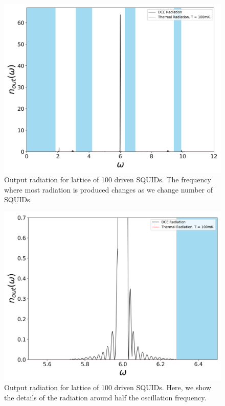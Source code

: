 %
\begin{figure}[h]
    \includegraphics[width=\textwidth, keepaspectratio]{figures/results/100_SQUIDs_active_100mK.png}
    \caption{Output radiation for lattice of 100 driven SQUIDs. The frequency where most radiation is produced changes as we change number of SQUIDs.}
    \label{fig:100_SQUIDs_active}
\end{figure}

\clearpage
%
\begin{figure}[h]
    \includegraphics[width=\textwidth, keepaspectratio]{figures/results/100_SQUIDs_active_100mK_zoom.png}
    \caption{Output radiation for lattice of 100 driven SQUIDs. Here, we show the details of the radiation around half the oscillation frequency.}
    \label{fig:100_SQUIDs_active_zoomed}
\end{figure}
\clearpage
%

